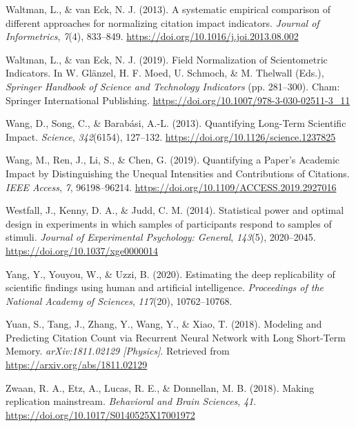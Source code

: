 \documentclass[
  english,
  jou,floatsintext]{apa6}
\newlength{\cslhangindent}
\newlength{\cslentryspacingunit} %
\newenvironment{CSLReferences}[2] %
 {%
  \setlength{\parindent}{0pt}
  \ifodd #1
  \let\oldpar\par
  \def\par{\hangindent=\cslhangindent\oldpar}
  \fi
  \setlength{\parskip}{#2\cslentryspacingunit}
 }%
 {}
\begin{document}
\begin{CSLReferences}{1}{0}
\leavevmode{}%
Waltman, L., \& van Eck, N. J. (2013). A systematic empirical comparison of different approaches for normalizing citation impact indicators. \emph{Journal of Informetrics}, \emph{7}(4), 833--849. \url{https://doi.org/10.1016/j.joi.2013.08.002}

\leavevmode{}%
Waltman, L., \& van Eck, N. J. (2019). Field {Normalization} of {Scientometric Indicators}. In W. Glänzel, H. F. Moed, U. Schmoch, \& M. Thelwall (Eds.), \emph{Springer {Handbook} of {Science} and {Technology Indicators}} (pp. 281--300). {Cham}: {Springer International Publishing}. \url{https://doi.org/10.1007/978-3-030-02511-3_11}

\leavevmode{}%
Wang, D., Song, C., \& Barabási, A.-L. (2013). Quantifying {Long}-{Term Scientific Impact}. \emph{Science}, \emph{342}(6154), 127--132. \url{https://doi.org/10.1126/science.1237825}

\leavevmode{}%
Wang, M., Ren, J., Li, S., \& Chen, G. (2019). Quantifying a {Paper}'s {Academic Impact} by {Distinguishing} the {Unequal Intensities} and {Contributions} of {Citations}. \emph{IEEE Access}, \emph{7}, 96198--96214. \url{https://doi.org/10.1109/ACCESS.2019.2927016}

\leavevmode{}%
Westfall, J., Kenny, D. A., \& Judd, C. M. (2014). Statistical power and optimal design in experiments in which samples of participants respond to samples of stimuli. \emph{Journal of Experimental Psychology: General}, \emph{143}(5), 2020--2045. \url{https://doi.org/10.1037/xge0000014}

\leavevmode{}%
Yang, Y., Youyou, W., \& Uzzi, B. (2020). Estimating the deep replicability of scientific findings using human and artificial intelligence. \emph{Proceedings of the National Academy of Sciences}, \emph{117}(20), 10762--10768.

\leavevmode{}%
Yuan, S., Tang, J., Zhang, Y., Wang, Y., \& Xiao, T. (2018). Modeling and {Predicting Citation Count} via {Recurrent Neural Network} with {Long Short}-{Term Memory}. \emph{arXiv:1811.02129 {[}Physics{]}}. Retrieved from \url{https://arxiv.org/abs/1811.02129}

\leavevmode{}%
Zwaan, R. A., Etz, A., Lucas, R. E., \& Donnellan, M. B. (2018). Making replication mainstream. \emph{Behavioral and Brain Sciences}, \emph{41}. \url{https://doi.org/10.1017/S0140525X17001972}

\end{CSLReferences}
\end{document}
